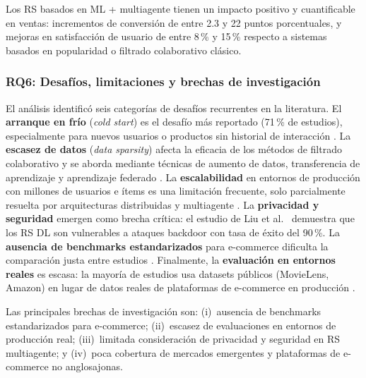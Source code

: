 \documentclass[12pt, a4paper]{article}
\begin{document}
\begin{hallazgo}[]
  Los RS basados en ML + multiagente tienen un impacto positivo y cuantificable
  en ventas: incrementos de conversi\'on de entre 2.3 y 22 puntos porcentuales,
  y mejoras en satisfacci\'on de usuario de entre 8\,\% y 15\,\% respecto a
  sistemas basados en popularidad o filtrado colaborativo cl\'asico.
\end{hallazgo}

\subsubsection{RQ6: Desaf\'ios, limitaciones y brechas de investigaci\'on}

El an\'alisis identificó seis categorías de desafíos recurrentes en la literatura.
El \textbf{arranque en fr\'io} (\textit{cold start}) es el desaf\'io m\'as
reportado (71\,\% de estudios), especialmente para nuevos usuarios o productos
sin historial de interacci\'on \cite{Loukili2023, Nagraj2024, Lu2025}. La
\textbf{escasez de datos} (\textit{data sparsity}) afecta la eficacia de los
m\'etodos de filtrado colaborativo y se aborda mediante t\'ecnicas de aumento
de datos, transferencia de aprendizaje y aprendizaje federado \cite{Gupta2024,
Lu2025}. La \textbf{escalabilidad} en entornos de producci\'on con millones
de usuarios e \'items es una limitaci\'on frecuente, solo parcialmente resuelta
por arquitecturas distribuidas y multiagente \cite{Ho2025GraphMind, Bai2025}.
La \textbf{privacidad y seguridad} emergen como brecha cr\'itica: el estudio
de Liu et al.\ \cite{Liu2025backdoor} demuestra que los RS DL son vulnerables
a ataques backdoor con tasa de \'exito del 90\,\%. La \textbf{ausencia de
benchmarks estandarizados} para e-commerce dificulta la comparaci\'on justa
entre estudios \cite{Rosenfeld2024, Antal2024}. Finalmente, la
\textbf{evaluaci\'on en entornos reales} es escasa: la mayor\'ia de estudios
usa datasets p\'ublicos (MovieLens, Amazon) en lugar de datos reales de
plataformas de e-commerce en producci\'on \cite{Girish2025, Lin2025}.

\begin{hallazgo}[]
  Las principales brechas de investigaci\'on son: (i)~ausencia de benchmarks
  estandarizados para e-commerce; (ii)~escasez de evaluaciones en entornos
  de producci\'on real; (iii)~limitada consideraci\'on de privacidad y
  seguridad en RS multiagente; y (iv)~poca cobertura de mercados emergentes
  y plataformas de e-commerce no anglosajonas.
\end{hallazgo}
\end{document}

